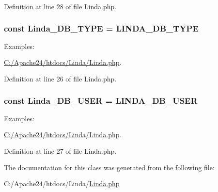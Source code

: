 Definition at line 28 of file Linda.\+php.

\hypertarget{class_linda_af392abe38a40b56515eb835fa3c39d8c}{}
\subsubsection[{Linda\+\_\+\+D\+B\+\_\+\+T\+Y\+P\+E}]{\setlength{\rightskip}{0pt plus 5cm}const Linda\+\_\+\+D\+B\+\_\+\+T\+Y\+P\+E = {\bf L\+I\+N\+D\+A\+\_\+\+D\+B\+\_\+\+T\+Y\+P\+E}}\label{class_linda_af392abe38a40b56515eb835fa3c39d8c}
\begin{Desc}
\item[Examples\+: ]\par
\hyperlink{_c_1_2_apache24_2htdocs_2_linda_2_linda_8php-example}{C\+:/\+Apache24/htdocs/\+Linda/\+Linda.\+php}.\end{Desc}


Definition at line 26 of file Linda.\+php.

\hypertarget{class_linda_a73fe432dd03d1c21aa74940da5c04dc0}{}
\subsubsection[{Linda\+\_\+\+D\+B\+\_\+\+U\+S\+E\+R}]{\setlength{\rightskip}{0pt plus 5cm}const Linda\+\_\+\+D\+B\+\_\+\+U\+S\+E\+R = {\bf L\+I\+N\+D\+A\+\_\+\+D\+B\+\_\+\+U\+S\+E\+R}}\label{class_linda_a73fe432dd03d1c21aa74940da5c04dc0}
\begin{Desc}
\item[Examples\+: ]\par
\hyperlink{_c_1_2_apache24_2htdocs_2_linda_2_linda_8php-example}{C\+:/\+Apache24/htdocs/\+Linda/\+Linda.\+php}.\end{Desc}


Definition at line 27 of file Linda.\+php.



The documentation for this class was generated from the following file\+:\begin{DoxyCompactItemize}
\item 
C\+:/\+Apache24/htdocs/\+Linda/\hyperlink{_linda_8php}{Linda.\+php}\end{DoxyCompactItemize}
